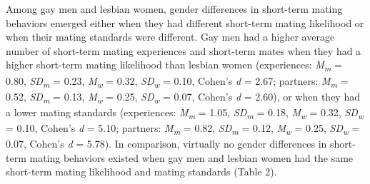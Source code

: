 \documentclass[
  11pt,
]{article}
\begin{document}
Among gay men and lesbian women, gender differences in short-term mating
behaviors emerged either when they had different short-term mating
likelihood or when their mating standards were different. Gay men had a
higher average number of short-term mating experiences and short-term
mates when they had a higher short-term mating likelihood than lesbian
women (experiences: \emph{M\textsubscript{m}} = 0.80,
\emph{SD\textsubscript{m}} = 0.23, \emph{M\textsubscript{w}} = 0.32,
\emph{SD\textsubscript{w}} = 0.10, Cohen's \emph{d} = 2.67; partners:
\emph{M\textsubscript{m}} = 0.52, \emph{SD\textsubscript{m}} = 0.13,
\emph{M\textsubscript{w}} = 0.25, \emph{SD\textsubscript{w}} = 0.07,
Cohen's \emph{d} = 2.60), or when they had a lower mating standards
(experiences: \emph{M\textsubscript{m}} = 1.05,
\emph{SD\textsubscript{m}} = 0.18, \emph{M\textsubscript{w}} = 0.32,
\emph{SD\textsubscript{w}} = 0.10, Cohen's \emph{d} = 5.10; partners:
\emph{M\textsubscript{m}} = 0.82, \emph{SD\textsubscript{m}} = 0.12,
\emph{M\textsubscript{w}} = 0.25, \emph{SD\textsubscript{w}} = 0.07,
Cohen's \emph{d} = 5.78). In comparison, virtually no gender differences
in short-term mating behaviors existed when gay men and lesbian women
had the same short-term mating likelihood and mating standards (Table
2).
\end{document}
